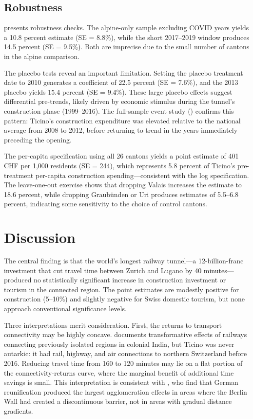 \documentclass[12pt]{article}
\begin{document}


\subsection{Robustness}

 presents robustness checks. The alpine-only sample excluding COVID years yields a 10.8 percent estimate (SE = 8.8\%), while the short 2017--2019 window produces 14.5 percent (SE = 9.5\%). Both are imprecise due to the small number of cantons in the alpine comparison.

The placebo tests reveal an important limitation. Setting the placebo treatment date to 2010 generates a coefficient of 22.5 percent (SE = 7.6\%), and the 2013 placebo yields 15.4 percent (SE = 9.4\%). These large placebo effects suggest differential pre-trends, likely driven by economic stimulus during the tunnel's construction phase (1999--2016). The full-sample event study () confirms this pattern: Ticino's construction expenditure was elevated relative to the national average from 2008 to 2012, before returning to trend in the years immediately preceding the opening.

The per-capita specification using all 26 cantons yields a point estimate of 401 CHF per 1,000 residents (SE = 244), which represents 5.8 percent of Ticino's pre-treatment per-capita construction spending---consistent with the log specification. The leave-one-out exercise shows that dropping Valais increases the estimate to 18.6 percent, while dropping Graub\"unden or Uri produces estimates of 5.5--6.8 percent, indicating some sensitivity to the choice of control cantons.



\section{Discussion}

The central finding is that the world's longest railway tunnel---a 12-billion-franc investment that cut travel time between Zurich and Lugano by 40 minutes---produced no statistically significant increase in construction investment or tourism in the connected region. The point estimates are modestly positive for construction (5--10\%) and slightly negative for Swiss domestic tourism, but none approach conventional significance levels.

Three interpretations merit consideration. First, the returns to transport connectivity may be highly concave. \citet{donaldson2018} documents transformative effects of railways connecting previously isolated regions in colonial India, but Ticino was never autarkic: it had rail, highway, and air connections to northern Switzerland before 2016. Reducing travel time from 160 to 120 minutes may lie on a flat portion of the connectivity-returns curve, where the marginal benefit of additional time savings is small. This interpretation is consistent with \citet{ahlfeldt2015}, who find that German reunification produced the largest agglomeration effects in areas where the Berlin Wall had created a discontinuous barrier, not in areas with gradual distance gradients.
\end{document}
